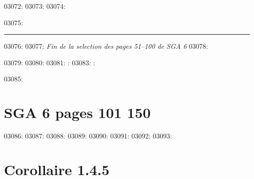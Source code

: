 03072: 
03073: \vfill
03074: \begin{center}
03075: \rule{0.5\textwidth}{0.4pt}
03076: 
03077: \textit{Fin de la selection des pages 51--100 de SGA 6}
03078: \end{center}
03079: 
03080: 
03081: : %
03083: : 
03085: \section*{SGA 6 pages 101 150}
03086: \setcounter{page}{101}
03087: 
03088: 
03089: 
03090: %
03091: %
03092: %
03093: \section*{Corollaire 1.4.5}